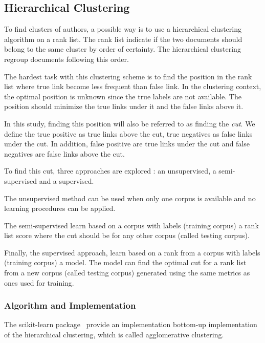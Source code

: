 \subsection{Hierarchical Clustering \label{sec:authorship_clustering_methods}}

To find clusters of authors, a possible way is to use a hierarchical clustering algorithm on a rank list.
The rank list indicate if the two documents should belong to the same cluster by order of certainty.
The hierarchical clustering regroup documents following this order.

The hardest task with this clustering scheme is to find the position in the rank list where true link become less frequent than false link.
In the clustering context, the optimal position is unknown since the true labels are not available.
The position should minimize the true links under it and the false links above it.

In this study, finding this position will also be referred to as finding the \textit{cut}.
We define the true positive as true links above the cut, true negatives as false links under the cut.
In addition, false positive are true links under the cut and false negatives are false links above the cut.

To find this cut, three approaches are explored : an unsupervised, a semi-supervised and a supervised.

The unsupervised method can be used when only one corpus is available and no learning procedures can be applied.

The semi-supervised learn based on a corpus with labels (training corpus) a rank list score where the cut should be for any other corpus (called testing corpus).

Finally, the supervised approach, learn based on a rank from a corpus with labels (training corpus) a model.
The model can find the optimal cut for a rank list from a new corpus (called testing corpus) generated using the same metrics as ones used for training.

\subsubsection{Algorithm and Implementation \label{sec:algorithm_and_implementation}}

The scikit-learn package~\cite{sklearn} provide an implementation bottom-up implementation of the hierarchical clustering, which is called agglomerative clustering.

